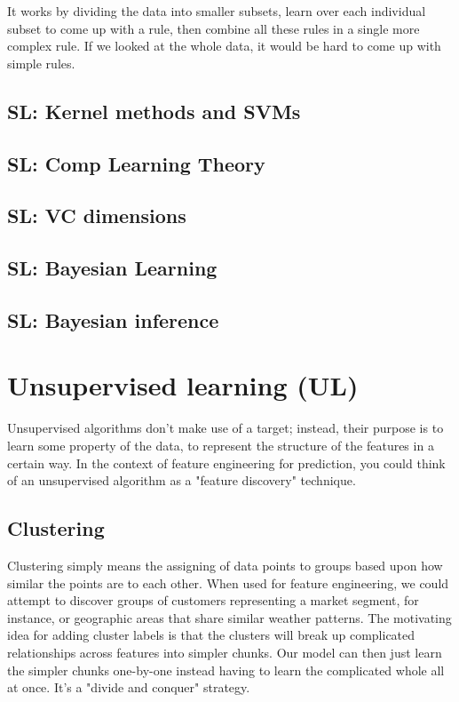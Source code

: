 \documentclass[12pt]{report}
\begin{document}
It works by dividing the data into smaller subsets, learn over each individual subset to come up with a rule, then combine all these rules in a single more complex rule. If we looked at the whole data, it would be hard to come up with simple rules.




\section{SL: Kernel methods and SVMs}
\section{SL: Comp Learning Theory}
\section{SL: VC dimensions}
\section{SL: Bayesian Learning}
\section{SL: Bayesian inference}


\chapter[Unsupervised learning]{Unsupervised learning (UL)}

Unsupervised algorithms don't make use of a target; instead, their purpose is to learn some property of the data, to represent the structure of the features in a certain way. In the context of feature engineering for prediction, you could think of an unsupervised algorithm as a "feature discovery" technique.

\section{Clustering}
Clustering simply means the assigning of data points to groups based upon how similar the points are to each other. When used for feature engineering, we could attempt to discover groups of customers representing a market segment, for instance, or geographic areas that share similar weather patterns. The motivating idea for adding cluster labels is that the clusters will break up complicated relationships across features into simpler chunks. Our model can then just learn the simpler chunks one-by-one instead having to learn the complicated whole all at once. It's a "divide and conquer" strategy.
\end{document}
